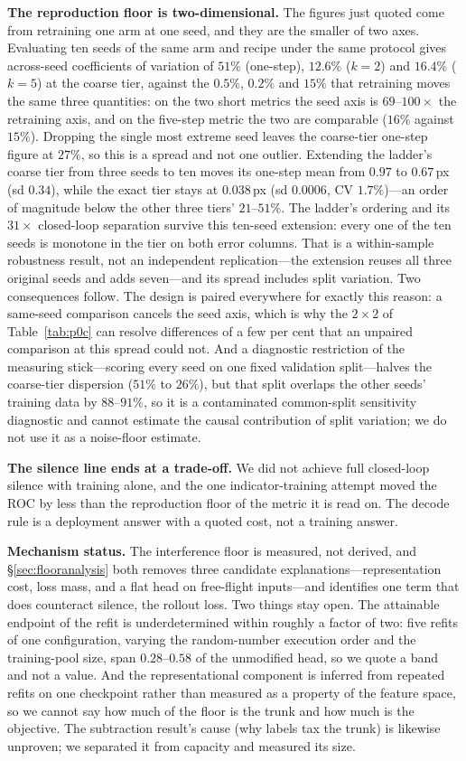 \documentclass{article}
\begin{document}
\textbf{The reproduction floor is two-dimensional.} The figures just quoted come from
retraining one arm at one seed, and they are the smaller of two axes. Evaluating ten
seeds of the same arm and recipe under the same protocol gives across-seed coefficients
of variation of $51\%$ (one-step), $12.6\%$ ($k{=}2$) and $16.4\%$ ($k{=}5$) at the coarse
tier, against the $0.5\%$, $0.2\%$ and $15\%$ that retraining moves the same three
quantities: on the two short metrics the seed axis is $69$--$100\times$ the retraining
axis, and on the five-step metric the two are comparable ($16\%$ against $15\%$).
Dropping the single most extreme seed leaves the coarse-tier one-step figure at $27\%$,
so this is a spread and not one outlier. Extending the ladder's coarse tier from three
seeds to ten moves its one-step mean from $0.97$ to $0.67$\,px (sd $0.34$), while the
exact tier stays at $0.038$\,px (sd $0.0006$, CV $1.7\%$)---an order of magnitude below
the other three tiers' $21$--$51\%$. The ladder's ordering and its $31\times$ closed-loop
separation survive this ten-seed extension: every one of the ten seeds is monotone in the
tier on both error columns. That is a within-sample robustness result, not an independent
replication---the extension reuses all three original seeds and adds seven---and its spread
includes split variation.
Two consequences follow. The design is paired everywhere for exactly this reason: a
same-seed comparison cancels the seed axis, which is why the $2\times2$ of
Table~\ref{tab:p0c} can resolve differences of a few per cent that an unpaired
comparison at this spread could not. And a diagnostic restriction of the measuring
stick---scoring every seed on one fixed validation split---halves the coarse-tier
dispersion ($51\%$ to $26\%$), but that split overlaps the other seeds' training data by
$88$--$91\%$, so it is a contaminated common-split sensitivity diagnostic and cannot estimate the
causal contribution of split variation; we do not use it as a noise-floor estimate.

\textbf{The silence line ends at a trade-off.} We did not achieve full closed-loop silence with training alone, and the one indicator-training attempt moved the ROC by less than the reproduction floor of the metric it is read on. The decode rule is a deployment answer with a quoted cost, not a training answer.

\textbf{Mechanism status.} The interference floor is measured, not derived, and
\S\ref{sec:flooranalysis} both removes three candidate explanations---representation
cost, loss mass, and a flat head on free-flight inputs---and identifies one term that
does counteract silence, the rollout loss. Two things stay open. The attainable
endpoint of the refit is underdetermined within roughly a factor of two: five refits
of one configuration, varying the random-number execution order and the training-pool
size, span $0.28$--$0.58$ of the unmodified head, so we quote a band and not a value.
And the representational component is inferred from repeated refits on one checkpoint
rather than measured as a property of the feature space, so we cannot say how much of
the floor is the trunk and how much is the objective. The subtraction result's cause
(why labels tax the trunk) is likewise unproven; we separated it from capacity and
measured its size.
\end{document}

